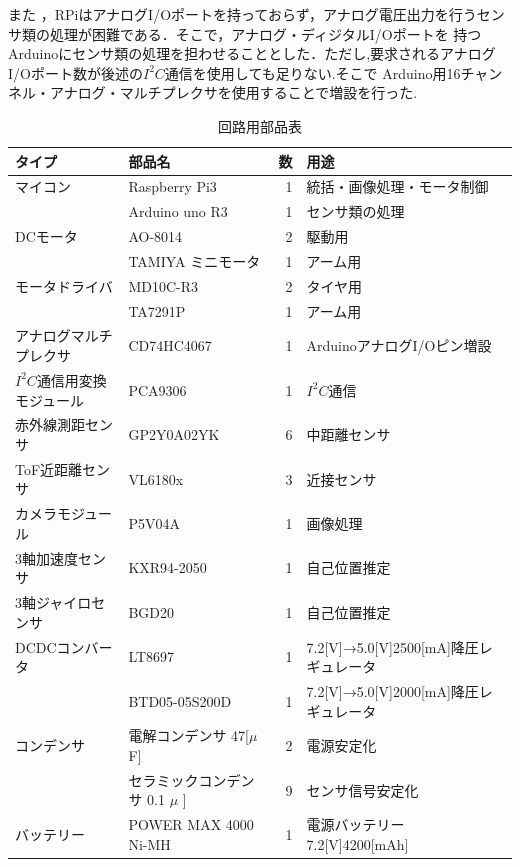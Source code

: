 \documentclass[10pt,a4j]{ujarticle}
\begin{document}
また ，RPiはアナログI/Oポートを持っておらず，アナログ電圧出力を行うセンサ類の処理が困難である．そこで，アナログ・ディジタルI/Oポートを
持つArduinoにセンサ類の処理を担わせることとした．ただし,要求されるアナログI/Oポート数が後述の$I^2 C$通信を使用しても足りない.そこで
Arduino用16チャンネル・アナログ・マルチプレクサを使用することで増設を行った.
\begin{table}[h]
  \centering
  \caption{回路用部品表}
  \begin{tabular}{|l|l|r||l|} \hline
    タイプ & 部品名 & 数 & 用途 \\ \hline \hline
     マイコン & Raspberry Pi3 & 1& 統括・画像処理・モータ制御 \\ \cline{2-4}
   　　& Arduino uno R3& 1 & センサ類の処理 \\ \hline
     DCモータ & AO-8014 & 2 & 駆動用 \\ \cline{2-4}
      & TAMIYA ミニモータ & 1&アーム用  \\ \hline
    モータドライバ& MD10C-R3 & 2& タイヤ用 \\ \cline{2-4}
      &  TA7291P&1 &アーム用 \\ \hline
   アナログマルチプレクサ & CD74HC4067 & 1 & ArduinoアナログI/Oピン増設 \\ \hline
    $I^2 C$通信用変換モジュール&PCA9306&1&$I^2 C$通信\\ \hline
     赤外線測距センサ& GP2Y0A02YK &6&中距離センサ\\ \hline
      ToF近距離センサ& VL6180x&3&近接センサ \\ \hline
     カメラモジュール&P5V04A&1&画像処理\\ \hline
     3軸加速度センサ&KXR94-2050&1&自己位置推定\\ \hline
     3軸ジャイロセンサ&BGD20&1&自己位置推定\\ \hline
    DCDCコンバータ&LT8697&1& 7.2[V]→5.0[V]2500[mA]降圧レギュレータ\\ \cline{2-4}
       &BTD05-05S200D&1&7.2[V]→5.0[V]2000[mA]降圧レギュレータ\\ \hline
    コンデンサ&電解コンデンサ 47[$\mu$F]&2&電源安定化\\ \cline{2-4}
            &セラミックコンデンサ 0.1 $\mu$ ]&9&センサ信号安定化\\ \hline
   バッテリー&POWER MAX 4000 Ni-MH&1&電源バッテリー 7.2[V]4200[mAh]\\ \hline
                 
  \end{tabular}
  \label{tab:c_parts}
\end{table}
\end{document}
